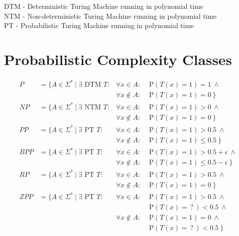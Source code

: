 \documentclass[
    14pt,
    oneside,
    a4paper,
    numbers=enddot,
    abstractoff,
    parskip=full
]{scrreprt}
\begin{document}
DTM - Deterministic Turing Machine running in polynomial time\\
NTM - Non-deterministic Turing Machine running in polynomial time\\
PT - Probabilistic Turing Machine running in polynomial time\\

\section*{Probabilistic Complexity Classes}
\label{sec:probabilistic_complexity_classes}


\begin{align*}
    P & = \{
    A \in \Sigma^\ast ~|~
    \exists \text{ DTM } T:
    & \forall x \in A:      & \text{ P}(T(x)=1) = 1 ~\land \\
    & & \forall x \notin A: & \text{ P}(T(x)=1) = 0 ~\}
    \\
    NP & = \{
    A \in \Sigma^\ast ~|~
    \exists \text{ NTM } T:
    & \forall x \in A:      & \text{ P}(T(x)=1) > 0 ~\land \\
    & & \forall x \notin A: & \text{ P}(T(x)=1) = 0 ~\}
    \\
    PP & = \{
    A \in \Sigma^\ast ~|~
    \exists \text{ PT } T:
    & \forall x \in A:      & \text{ P}(T(x)=1) > 0.5 ~\land \\
    & & \forall x \notin A: & \text{ P}(T(x)=1) \leq 0.5 ~\}
    \\
    BPP & = \{
    A \in \Sigma^\ast ~|~
    \exists \text{ PT } T:
    & \forall x \in A:      & \text{ P}(T(x)=1) > 0.5 + \epsilon ~\land \\
    & & \forall x \notin A: & \text{ P}(T(x)=1) \leq 0.5 - \epsilon ~\}
    \\
    RP & = \{
    A \in \Sigma^\ast ~|~
    \exists \text{ PT } T:
    & \forall x \in A:      & \text{ P}(T(x)=1) > 0.5 ~\land \\
    & & \forall x \notin A: & \text{ P}(T(x)=1) = 0 ~\}
    \\
    ZPP & = \{
    A \in \Sigma^\ast ~|~
    \exists \text{ PT } T:
    & \forall x \in A:      & \text{ P}(T(x)=1) > 0.5 ~\land \\
    & &                     & \text{ P}(T(x)=\,?\,) < 0.5 ~\land \\
    & & \forall x \notin A: & \text{ P}(T(x)=1) = 0 ~\land \\
    & &                     & \text{ P}(T(x)=\,?\,) < 0.5 ~\}
\end{align*}
\end{document}
